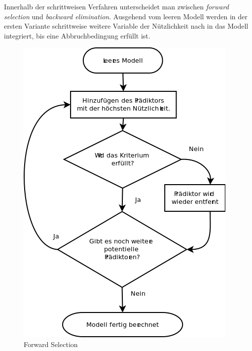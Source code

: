 \documentclass[english,12pt,doc]{apa}
\begin{document}
Innerhalb der schrittweisen Verfahren unterscheidet man zwischen \textit{forward selection} und \textit{backward elimination}. 
Ausgehend vom leeren Modell werden in der ersten Variante schrittweise weitere Variable der Nützlichkeit nach in das Modell integriert, bis eine Abbruchbedingung erfüllt ist. 
\begin{figure}[hb]
	\centering
	\includegraphics[width=\textwidth]{forward_stepwise.png}
	\caption{Forward Selection}
	\label{fig:forward_stepwise}
\end{figure}
\end{document}
